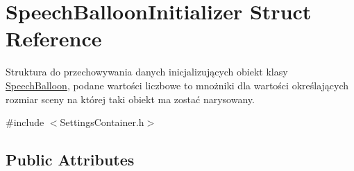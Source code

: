 \hypertarget{struct_speech_balloon_initializer}{}\section{Speech\+Balloon\+Initializer Struct Reference}
\label{struct_speech_balloon_initializer}


Struktura do przechowywania danych inicjalizujących obiekt klasy \mbox{\hyperlink{class_speech_balloon}{Speech\+Balloon}}, podane wartości liczbowe to mnożniki dla wartości określających rozmiar sceny na której taki obiekt ma zostać narysowany.  




{\ttfamily \#include $<$Settings\+Container.\+h$>$}

\subsection*{Public Attributes}
